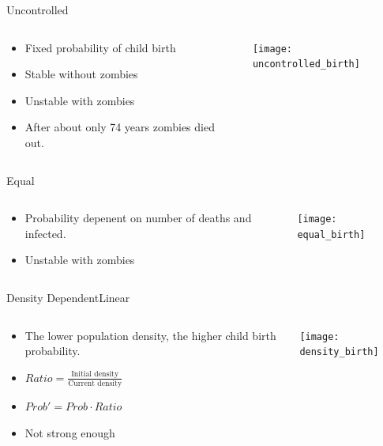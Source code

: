 \documentclass{beamer}
\begin{document}
\begin{frame}{Uncontrolled}
    \begin{columns}
        \begin{column}{0.4\textwidth}
            \begin{itemize}
                \item Fixed probability of child birth
                \item Stable without zombies
                \item Unstable with zombies
                \item After about only 74 years zombies died out.
            \end{itemize}
        \end{column}
        \begin{column}{0.6\textwidth}
            \texttt{[image: uncontrolled\_birth]}
        \end{column}
    \end{columns}
\end{frame}

\begin{frame}{Equal}
    \begin{columns}
        \begin{column}{0.4\textwidth}
            \begin{itemize}
                \item Probability depenent on number of deaths and infected.
                \item Unstable with zombies
            \end{itemize}
        \end{column}
        \begin{column}{0.6\textwidth}
            \texttt{[image: equal\_birth]}
        \end{column}
    \end{columns}
\end{frame}

\begin{frame}{Density Dependent}{Linear}
    \begin{columns}
        \begin{column}{0.4\textwidth}
            \begin{itemize}
                \item The lower population density, the higher child birth probability.
                \item $Ratio = \frac{\text{Initial density}}{\text{Current density}}$
                \item $Prob' = Prob \cdot Ratio$
                \item Not strong enough
            \end{itemize}
        \end{column}
        \begin{column}{0.6\textwidth}
            \texttt{[image: density\_birth]}
        \end{column}
    \end{columns}
\end{frame}
\end{document}
